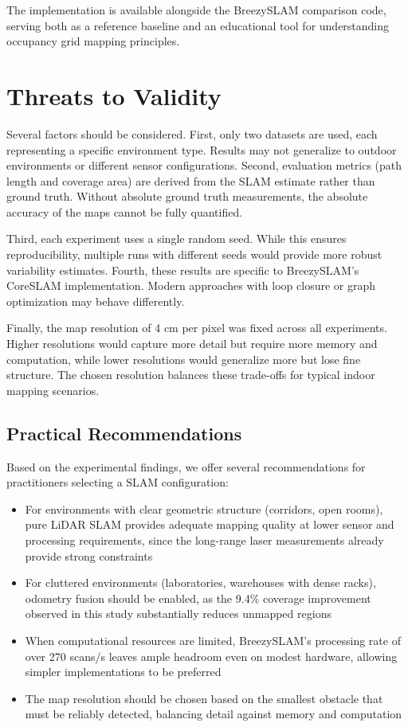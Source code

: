 \documentclass[conference]{IEEEtran}
\begin{document}
  The implementation is available alongside the BreezySLAM comparison code, serving both as a reference
  baseline and an educational tool for understanding occupancy grid mapping principles.

  \section{Threats to Validity}

  Several factors should be considered. First, only two datasets are used, each representing a specific
  environment type. Results may not generalize to outdoor environments or different sensor configurations.
  Second, evaluation metrics (path length and coverage area) are derived from the SLAM estimate rather
  than ground truth. Without absolute ground truth measurements, the absolute accuracy of the maps cannot
  be fully quantified.

  Third, each experiment uses a single random seed. While this ensures reproducibility, multiple runs with
  different seeds would provide more robust variability estimates. Fourth, these results are specific to
  BreezySLAM's CoreSLAM implementation. Modern approaches with loop closure or graph optimization may
  behave differently.

  Finally, the map resolution of 4 cm per pixel was fixed across all experiments. Higher resolutions would
  capture more detail but require more memory and computation, while lower resolutions would generalize
  more but lose fine structure. The chosen resolution balances these trade-offs for typical indoor mapping
  scenarios.

   \subsection{Practical Recommendations}

  Based on the experimental findings, we offer several recommendations for practitioners selecting a SLAM
  configuration:

  \begin{itemize}
      \item For environments with clear geometric structure (corridors, open rooms), pure LiDAR SLAM
  provides adequate mapping quality at lower sensor and processing requirements, since the long-range
  laser measurements already provide strong constraints
      \item For cluttered environments (laboratories, warehouses with dense racks), odometry fusion should
  be enabled, as the 9.4\% coverage improvement observed in this study substantially reduces unmapped
  regions
      \item When computational resources are limited, BreezySLAM's processing rate of over 270 scans/s
  leaves ample headroom even on modest hardware, allowing simpler implementations to be preferred
      \item The map resolution should be chosen based on the smallest obstacle that must be reliably
  detected, balancing detail against memory and computation
  \end{itemize}
\end{document}
